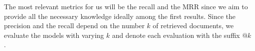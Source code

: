 The most relevant metrics for us will be the recall and the MRR since we aim to provide all the necessary knowledge ideally among the first results.
Since the precision and the recall depend on the number $k$ of retrieved documents, we evaluate the models with varying $k$ and denote each evaluation with the suffix $\text{@}k$.